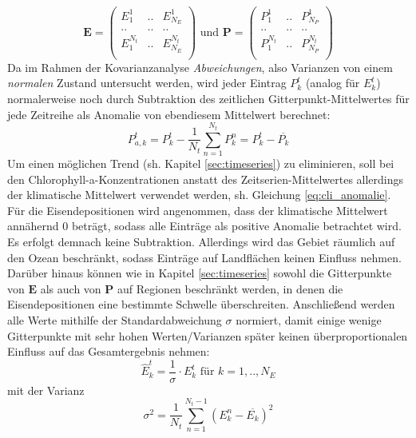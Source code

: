 \documentclass[12pt,a4paper,onecolumn,draft]{scrartcl}
\begin{document}
\begin{equation}
\textbf{E} = \begin{pmatrix} E_{1}^1 & .. & E_{N_E}^1 \\ .. & .. & .. \\ E_{1}^{N_t} & .. & E_{N_E}^{N_t} \\ \end{pmatrix} \text{ und } \textbf{P} = \begin{pmatrix} P_{1}^1 & .. & P_{N_P}^1 \\ .. & .. & .. \\ P_{1}^{N_t} & .. & P_{N_P}^{N_t} \\ \end{pmatrix} \label{eq:E_and_P}
\end{equation}
Da im Rahmen der Kovarianzanalyse \textit{Abweichungen}, also Varianzen von einem \textit{normalen} Zustand untersucht werden, wird jeder Eintrag $P_k^t$ (analog für $E_k^t$) normalerweise noch durch Subtraktion des zeitlichen Gitterpunkt-Mittelwertes für jede Zeitreihe als Anomalie von ebendiesem Mittelwert berechnet:
\begin{equation}
P_{a,k}^t = P_k^t - \frac{1}{N_t} \sum\limits_{n=1}^{N_t} P_k^n = P_k^t - \overline{P_k}
\end{equation}
Um einen möglichen Trend (sh. Kapitel \ref{sec:timeseries}) zu eliminieren, soll bei den Chlorophyll-a-Konzentrationen anstatt des Zeitserien-Mittelwertes allerdings der klimatische Mittelwert verwendet werden, sh. Gleichung \ref{eq:cli_anomalie}. Für die Eisendepositionen wird angenommen, dass der klimatische Mittelwert annähernd 0 beträgt, sodass alle Einträge als positive Anomalie betrachtet wird. Es erfolgt demnach keine Subtraktion. Allerdings wird das Gebiet räumlich auf den Ozean beschränkt, sodass Einträge auf Landflächen keinen Einfluss nehmen. Darüber hinaus können wie in Kapitel \ref{sec:timeseries} sowohl die Gitterpunkte von $\textbf{E}$ als auch von $\textbf{P}$ auf Regionen beschränkt werden, in denen die Eisendepositionen eine bestimmte Schwelle überschreiten. Anschließend werden alle Werte mithilfe der Standardabweichung $\sigma$ normiert, damit einige wenige Gitterpunkte mit sehr hohen Werten/Varianzen später keinen überproportionalen Einfluss auf das Gesamtergebnis nehmen:
\begin{equation}
\hat{E}_k^t =  \frac{1}{\sigma} \cdot E_k^t \text{ für } k = 1,..,N_E 
\end{equation}
mit der Varianz
\begin{equation}
\sigma^2 = \frac{1}{N_t} \sum\limits_{n=1}^{N_t-1}(E_k^n-\overline{E_k})^2
\end{equation}
\end{document}
